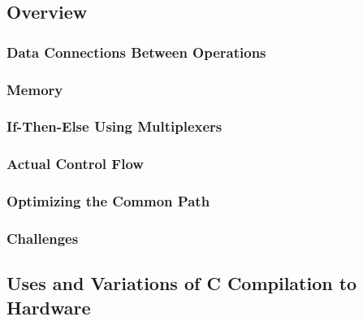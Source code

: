 \subsection{Overview}
\label{cForSpatial:overview}

\subsubsection{Data Connections Between Operations}
\label{cForSpatial:dataConnections}

\subsubsection{Memory}
\label{cForSpatial:memory}

\subsubsection{If-Then-Else Using Multiplexers}
\label{cForSpatial:ifThenElse}

\subsubsection{Actual Control Flow}
\label{cForSpatial:actualControlFlow}

\subsubsection{Optimizing the Common Path}
\label{cForSpatial:optimizing}

\subsubsection{Challenges}
\label{cForSpatial:challenges}

\subsection{Uses and Variations of C Compilation to Hardware}
\label{cForSpatial:uses}
